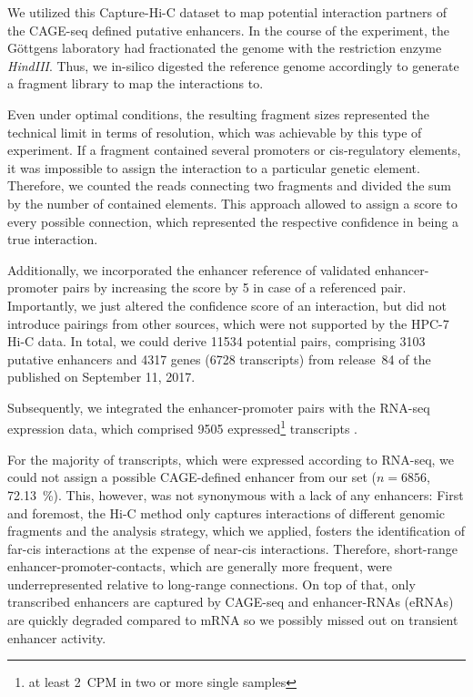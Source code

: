 We utilized this Capture-Hi-C dataset to map potential interaction partners of the CAGE-seq defined putative enhancers. In the course of the experiment, the Göttgens laboratory had fractionated the genome with the restriction enzyme \emph{HindIII}. Thus, we in-silico digested the \mmnine reference genome accordingly to generate a fragment library to map the interactions to. 

Even under optimal conditions, the resulting fragment sizes represented the technical limit in terms of resolution, which was achievable by this type of experiment. If a fragment contained several promoters or cis-regulatory elements, it was impossible to assign the interaction to a particular genetic element. Therefore, we counted the reads connecting two fragments and divided the sum by the number of contained elements. This approach allowed to assign a score to every possible connection, which represented the respective confidence in being a true interaction. 

Additionally, we incorporated the \cite{Hait2018} enhancer reference of validated enhancer-promoter pairs by increasing the score by \num{5} in case of a referenced pair. Importantly, we just altered the confidence score of an interaction, but did not introduce pairings from other sources, which were not supported by the HPC-7 Hi-C data.
In total, we could derive \num{11534} potential pairs, comprising \num{3103} putative enhancers and \num{4317} genes (\num{6728} transcripts) from release~\num{84} of the  published on September 11, 2017. 

Subsequently, we integrated the enhancer-promoter pairs with the RNA-seq expression data, which comprised \num{9505} expressed\footnote{at least \SI{2}{CPM} in two or more single samples} transcripts . 

For the majority of transcripts, which were expressed according to RNA-seq, we could not assign a possible CAGE-defined enhancer from our set ($n\!=\!6856$, \SI{72.13}{\percent}). This, however, was not synonymous with a lack of any enhancers: First and foremost, the Hi-C method only captures interactions of different genomic fragments and the analysis strategy, which we applied, fosters the identification of far-cis interactions at the expense of near-cis interactions. Therefore, short-range enhancer-promoter-contacts, which are generally more frequent\cite{Villar2015,Walter2019}, were underrepresented relative to long-range connections. On top of that, only transcribed enhancers are captured by CAGE-seq and enhancer-RNAs (eRNAs) are quickly degraded compared to mRNA so we possibly missed out on transient enhancer activity. 

